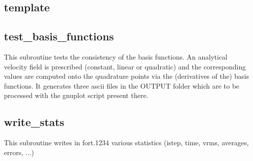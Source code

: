  \subsection{template}

 \subsection{test\_basis\_functions}
 This subroutine tests the consistency of the basis functions. 
 An analytical velocity field is prescribed (constant, linear or quadratic) and the 
 corresponding values are computed onto the quadrature points via the 
 (derivatives of the) basis functions.
 It generates three ascii files in the {\foldernamefont OUTPUT} folder which 
 are to be processed with the gnuplot script present there.
 \subsection{write\_stats}
 This subroutine writes in fort.1234 various statistics (istep, time, vrms, averages, 
 errors, ...) 
